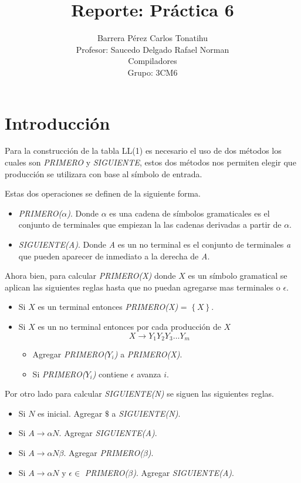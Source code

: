 \documentclass[12pt, titlepage]{article}
\title{Reporte: Práctica 6}
\author{Barrera Pérez Carlos Tonatihu \\ Profesor: Saucedo Delgado Rafael 
Norman 
\\ Compiladores \\ Grupo: 3CM6}
\begin{document}
    \maketitle
    \tableofcontents
    \newpage
    \section{Introducción}
    Para la construcción de la tabla LL(1) es necesario el uso de dos métodos 
los cuales son \emph{PRIMERO} y \emph{SIGUIENTE}, estos dos métodos nos 
permiten elegir que producción se utilizara con base al símbolo de 
entrada. \cite{compis}

Estas dos operaciones se definen de la siguiente forma.
\begin{itemize}
    \item \emph{PRIMERO($\alpha$)}. Donde $\alpha$ es una cadena de símbolos 
gramaticales es el conjunto de terminales que empiezan la las cadenas derivadas 
a partir de $\alpha$.
    \item \emph{SIGUIENTE(A)}. Donde \emph{A} es un no terminal es el conjunto 
de terminales \emph{a} que pueden aparecer de inmediato a la derecha de 
\emph{A}.
\end{itemize}
Ahora bien, para calcular \emph{PRIMERO(X)} donde $X$ es un símbolo gramatical 
se aplican las siguientes reglas hasta que no puedan agregarse mas terminales o 
$\epsilon$.
\begin{itemize}
    \item Si $X$ es un terminal entonces \emph{PRIMERO(X)} = 
$\left\lbrace X \right\rbrace $.
    \item Si $X$ es un no terminal entonces por cada producción de $X$
    \[X \rightarrow Y_1 Y_2 Y_3\ldots Y_m\]
    \begin{itemize}
     \item Agregar \emph{PRIMERO($Y_i$)} a \emph{PRIMERO(X)}.
     \item Si \emph{PRIMERO($Y_i$)} contiene $\epsilon$ 
avanza $i$.
    \end{itemize}
\end{itemize}
Por otro lado para calcular \emph{SIGUIENTE(N)} se 
siguen las siguientes reglas.
\begin{itemize}
 \item Si $N$ es inicial. Agregar $\$$ a \emph{SIGUIENTE(N)}.
 \item Si $A \rightarrow \alpha N$. Agregar \emph{SIGUIENTE(A)}.
 \item Si $A \rightarrow \alpha N \beta$. Agregar \emph{PRIMERO($\beta$)}.
 \item Si $A \rightarrow \alpha N$ y $\epsilon \in $ \emph{PRIMERO($\beta$)}. 
Agregar \emph{SIGUIENTE(A)}.
\end{itemize}
\end{document}
